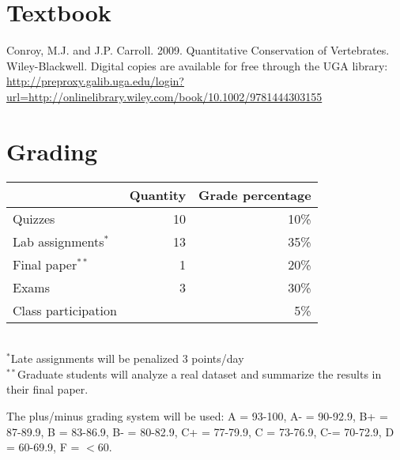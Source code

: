\documentclass[12pt]{article}
\begin{document}
\vspace{-2mm}
\section*{\normalsize Textbook}
\vspace{-4mm}
Conroy, M.J. and J.P. Carroll. 2009. Quantitative Conservation of
Vertebrates. Wiley-Blackwell.
Digital copies are available for free through the UGA library:
{\footnotesize \url{http://preproxy.galib.uga.edu/login?url=http://onlinelibrary.wiley.com/book/10.1002/9781444303155}}

\vspace{-2mm}
\section*{\normalsize Grading}
\vspace{-4mm}
\begin{center}
  \begin{tabular}[h!]{lrr}
    \hline
                              & Quantity & Grade percentage      \\
    \hline
    Quizzes                   & 10       & 10\%                  \\
    Lab assignments$^*$       & 13       & 35\%                  \\
    Final paper$^{**}$         & 1        & 20\%                  \\
    Exams                     & 3        & 30\%                  \\
    Class participation       &          & 5\%                   \\
    \hline
  \end{tabular}                                                  \\
  \small
\hspace{0mm} $^*$Late assignments will be penalized 3 points/day \\ 
\hspace{0mm} $^{**}$Graduate students will analyze a real dataset and
summarize the results in their final paper.
\end{center}
\vspace{-6pt}
{%
The plus/minus grading system will be used: %
A = 93-100, A- =
90-92.9, B+ = 87-89.9, B = 83-86.9, B- = 80-82.9, C+ = 77-79.9, C =
73-76.9, C-= 70-72.9, D = 60-69.9, F = $<$60. 
}
\end{document}
